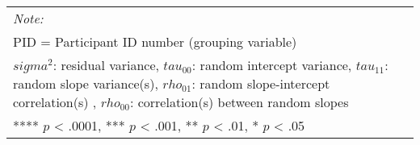 \documentclass{article}
\begin{document}
\begin{landscape}
\begin{table}
\begin{minipage}[t][\textheight][t]{\textwidth}
\begin{tabular}[t]{lcccccccccccccccccccccccccc}
\bottomrule
\multicolumn{27}{l}{\rule{0pt}{1em}\textit{Note: }}\\
\multicolumn{27}{l}{\rule{0pt}{1em}PID = Participant ID number (grouping variable)}\\
\multicolumn{27}{l}{\rule{0pt}{1em}$sigma^2$: residual variance, $tau_{00}$: random intercept variance, $tau_{11}$: random slope variance(s), $rho_{01}$: random slope-intercept correlation(s) , $rho_{00}$: correlation(s) between random slopes}\\
\multicolumn{27}{l}{\rule{0pt}{1em}**** $p$ < .0001, *** $p$ < .001, ** $p$ < .01, * $p$ < .05}\\
\end{tabular}
\end{minipage}
\end{table}
\end{landscape}
\end{document}
